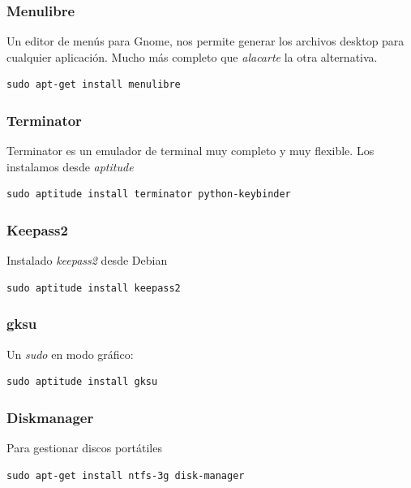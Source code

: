 \documentclass[12pt,spanish,]{article}
\begin{document}
\subsubsection{Menulibre}\label{menulibre}

Un editor de menús para Gnome, nos permite generar los archivos desktop
para cualquier aplicación. Mucho más completo que \emph{alacarte} la
otra alternativa.

\begin{verbatim}
sudo apt-get install menulibre
\end{verbatim}

\subsubsection{Terminator}\label{terminator}

Terminator es un emulador de terminal muy completo y muy flexible. Los
instalamos desde \emph{aptitude}

\begin{verbatim}
sudo aptitude install terminator python-keybinder
\end{verbatim}

\subsubsection{Keepass2}\label{keepass2}

Instalado \emph{keepass2} desde Debian

\begin{verbatim}
sudo aptitude install keepass2
\end{verbatim}

\subsubsection{gksu}\label{gksu}

Un \emph{sudo} en modo gráfico:

\begin{verbatim}
sudo aptitude install gksu
\end{verbatim}

\subsubsection{Diskmanager}\label{diskmanager}

Para gestionar discos portátiles

\begin{verbatim}
sudo apt-get install ntfs-3g disk-manager
\end{verbatim}
\end{document}
